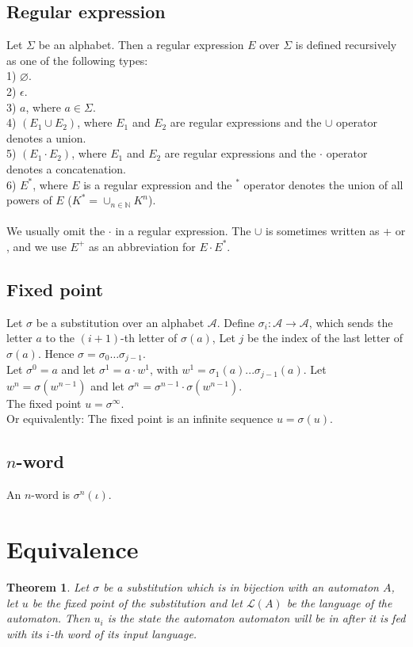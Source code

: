 \documentclass{article}
\begin{document}
\subsection{Regular expression}
Let $\Sigma$ be an alphabet. Then a regular expression $E$ over $\Sigma$ is
defined recursively as one of the following types:\\
1) $\varnothing$.\\
2) $\epsilon$.\\
3) $a$, where $a \in \Sigma$.\\
4) $(E_1 \cup E_2)$, where $E_1$ and $E_2$ are regular expressions and the
$\cup$ operator denotes a union.\\
5) $(E_1 \cdot E_2)$, where $E_1$ and $E_2$ are regular expressions and the
$\cdot$ operator denotes a concatenation.\\
6) $E^*$, where $E$ is a regular expression and the $^*$ operator denotes the
union of all powers of $E$ ($K^* = \cup_{n \in \mathbb{N}}K^n$).\\
\\
We usually omit the $\cdot$ in a regular expression. The $\cup$ is sometimes
written as + or , and we use $E^+$ as an abbreviation for $E \cdot E^*$.

\subsection{Fixed point}
Let $\sigma$ be a substitution over an alphabet $\mathcal{A}$. Define 
$\sigma_i: \mathcal{A \rightarrow A}$, which sends the letter $a$ to the 
$(i + 1)$-th letter of $\sigma(a)$, Let $j$ be the index of the last letter
of $\sigma(a)$. Hence $\sigma = \sigma_0 \ldots \sigma_{j - 1}$.\\
Let $\sigma^0 = a$ and let $\sigma^1 = a \cdot w^1$, with 
$w^1 = \sigma_1(a) ... \sigma_{j - 1}(a)$. Let $w^n = \sigma(w^{n - 1})$ and 
let $\sigma^n = \sigma^{n - 1} \cdot \sigma(w^{n - 1})$.\\
The fixed point $u = \sigma^\infty$.\\
Or equivalently: The fixed point is an infinite sequence $u = \sigma(u)$.

\subsection{$n$-word}
An $n$-word is $\sigma^n(\iota)$.

\section{Equivalence}
\newtheorem{automata}{Theorem} \begin{automata} \label{aiss}
Let $\sigma$ be a substitution which is in bijection with an automaton
$A$, let $u$ be the fixed point of the substitution and let 
$\mathcal{L}(A)$ be the language of the automaton. Then $u_i$ is the state 
the automaton automaton will be in after it is fed with its $i$-th word of 
its input language.
\end{automata}
\end{document}

